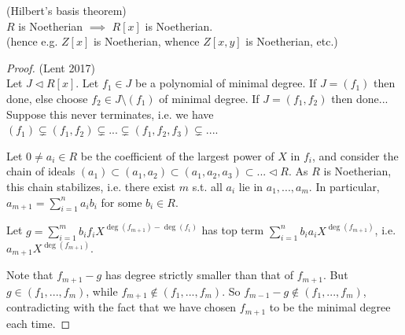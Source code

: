 \documentclass[a4paper]{article}
\begin{document}
\begin{thm}(Hilbert's basis theorem)\\
$R$ is Noetherian $\implies$ $R[x]$ is Noetherian.\\
(hence e.g. $Z[x]$ is Noetherian, whence $Z[x,y]$ is Noetherian, etc.)
\begin{proof} (Lent 2017)\\
Let $J \triangleleft R[x]$. Let $f_1 \in J$ be a polynomial of minimal degree. If $J=(f_1)$ then done, else choose $f_2 \in J \setminus (f_1)$ of minimal degree. If $J=(f_1,f_2)$ then done... Suppose this never terminates, i.e. we have $(f_1) \subsetneq (f_1,f_2) \subsetneq ... \subsetneq(f_1,f_2,f_3) \subsetneq ...$.

Let $0 \neq a_i \in R$ be the coefficient of the largest power of $X$ in $f_i$, and consider the chain of ideals $(a_1) \subset (a_1,a_2) \subset (a_1,a_2,a_3) \subset ... \triangleleft R$. As $R$ is Noetherian, this chain stabilizes, i.e. there exist $m$ s.t. all $a_i$ lie in $a_1,...,a_m$. In particular, $a_{m+1} = \sum_{i=1}^n a_i b_i$ for some $b_i \in R$.

Let $g = \sum_{i=1}^m b_i f_i X^{\deg(f_{m+1}) - \deg(f_i)}$ has top term $\sum_{i=1}^n b_i a_i X^{\deg(f_{m+1})}$, i.e. $a_{m+1} X^{\deg(f_{m+1})}$.

Note that $f_{m+1} - g$ has degree strictly smaller than that of $f_{m+1}$. But $g \in (f_1,...,f_m)$, while $f_{m+1} \not\in (f_1,...,f_m)$. So $f_{m-1} -g \not\in (f_1,...,f_m)$, contradicting with the fact that we have chosen $f_{m+1}$ to be the minimal degree each time.
\end{proof}


\end{thm}
\end{document}
